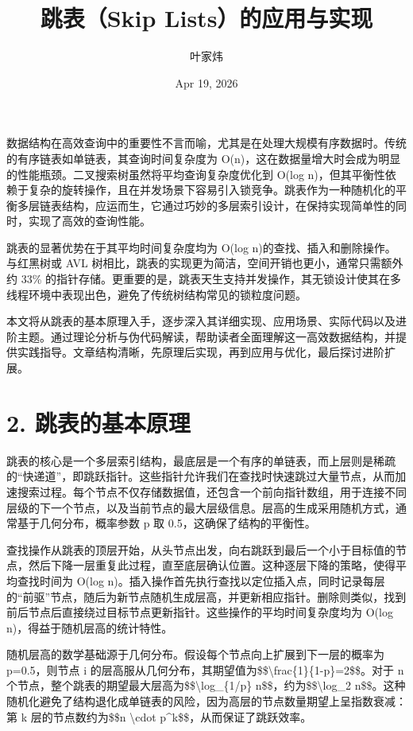 \title{跳表（Skip Lists）的应用与实现}
\author{叶家炜}
\date{Apr 19, 2026}
\maketitle
数据结构在高效查询中的重要性不言而喻，尤其是在处理大规模有序数据时。传统的有序链表如单链表，其查询时间复杂度为 O(n)，这在数据量增大时会成为明显的性能瓶颈。二叉搜索树虽然将平均查询复杂度优化到 O(log n)，但其平衡性依赖于复杂的旋转操作，且在并发场景下容易引入锁竞争。跳表作为一种随机化的平衡多层链表结构，应运而生，它通过巧妙的多层索引设计，在保持实现简单性的同时，实现了高效的查询性能。\par
跳表的显著优势在于其平均时间复杂度均为 O(log n)的查找、插入和删除操作。与红黑树或 AVL 树相比，跳表的实现更为简洁，空间开销也更小，通常只需额外约 33\%{} 的指针存储。更重要的是，跳表天生支持并发操作，其无锁设计使其在多线程环境中表现出色，避免了传统树结构常见的锁粒度问题。\par
本文将从跳表的基本原理入手，逐步深入其详细实现、应用场景、实际代码以及进阶主题。通过理论分析与伪代码解读，帮助读者全面理解这一高效数据结构，并提供实践指导。文章结构清晰，先原理后实现，再到应用与优化，最后探讨进阶扩展。\par
\chapter{2. 跳表的基本原理}
跳表的核心是一个多层索引结构，最底层是一个有序的单链表，而上层则是稀疏的“快递道”，即跳跃指针。这些指针允许我们在查找时快速跳过大量节点，从而加速搜索过程。每个节点不仅存储数据值，还包含一个前向指针数组，用于连接不同层级的下一个节点，以及当前节点的最大层级信息。层高的生成采用随机方式，通常基于几何分布，概率参数 p 取 0.5，这确保了结构的平衡性。\par
查找操作从跳表的顶层开始，从头节点出发，向右跳跃到最后一个小于目标值的节点，然后下降一层重复此过程，直至底层确认位置。这种逐层下降的策略，使得平均查找时间为 O(log n)。插入操作首先执行查找以定位插入点，同时记录每层的“前驱”节点，随后为新节点随机生成层高，并更新相应指针。删除则类似，找到前后节点后直接绕过目标节点更新指针。这些操作的平均时间复杂度均为 O(log n)，得益于随机层高的统计特性。\par
随机层高的数学基础源于几何分布。假设每个节点向上扩展到下一层的概率为 p=0.5，则节点 i 的层高服从几何分布，其期望值为\${}\${}\textbackslash{}frac\{{}1\}{}\{{}1-p\}{}=2\${}\${}。对于 n 个节点，整个跳表的期望最大层高为\${}\${}\textbackslash{}log\_{}\{{}1/p\}{} n\${}\${}，约为\${}\${}\textbackslash{}log\_{}2 n\${}\${}。这种随机化避免了结构退化成单链表的风险，因为高层的节点数量期望上呈指数衰减：第 k 层的节点数约为\${}\${}n \textbackslash{}cdot p\^{}k\${}\${}，从而保证了跳跃效率。\par
